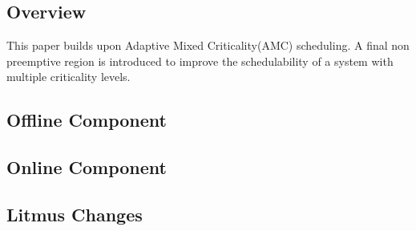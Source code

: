 \subsection{Overview}
This paper builds upon Adaptive Mixed Criticality(AMC) scheduling. A final non preemptive region is introduced to improve the schedulability of a system with multiple criticality levels.

\subsection{Offline Component}
\subsection{Online Component}
\subsection{Litmus Changes}